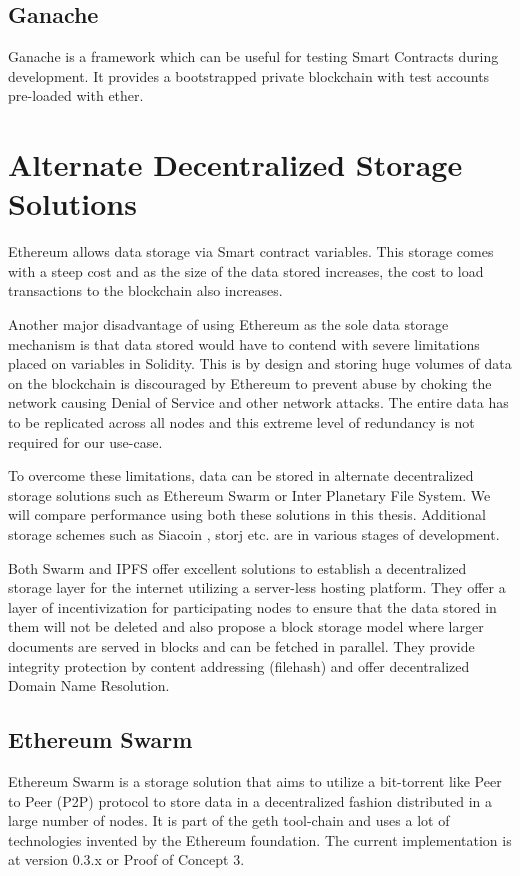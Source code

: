 \documentclass[11pt,openright]{report}
\begin{document}
\subsection{Ganache}
Ganache is a framework which can be useful for testing Smart Contracts during development. It provides a bootstrapped private blockchain with test accounts pre-loaded with ether.

\section{Alternate Decentralized Storage Solutions}
Ethereum allows data storage via Smart contract variables. This storage comes with a steep cost and as the size of the data stored increases, the cost to load transactions to the blockchain also increases.

Another major disadvantage of using Ethereum as the sole data storage mechanism is that data stored would have to contend with severe limitations placed on variables in Solidity. This is by design and storing huge volumes of data on the blockchain is discouraged by Ethereum to prevent abuse by choking the network causing Denial of Service and other network attacks. The entire data has to be replicated across all nodes and this extreme level of redundancy is not required for our use-case.

To overcome these limitations, data can be stored in alternate decentralized storage solutions such as Ethereum Swarm or Inter Planetary File System. We will compare performance using both these solutions in this thesis. Additional storage schemes such as Siacoin \cite{vorick2014sia}, storj \cite{wilkinsonetal2014storj} etc. are in various stages of development.

Both Swarm and IPFS offer excellent solutions to establish a decentralized storage layer for the internet utilizing a server-less hosting platform. They offer a layer of incentivization for participating nodes to ensure that the data stored in them will not be deleted and also propose a block storage model where larger documents are served in blocks and can be fetched in parallel. They provide integrity protection by content addressing (filehash) and offer decentralized Domain Name Resolution.

\subsection{Ethereum Swarm}
Ethereum Swarm \cite{swarm} is a storage solution that aims to utilize a bit-torrent like Peer to Peer (P2P) protocol to store data in a decentralized fashion distributed in a large number of nodes. It is part of the geth tool-chain and uses a lot of technologies invented by the Ethereum foundation. The current implementation is at version 0.3.x or Proof of Concept 3. 
\end{document}
